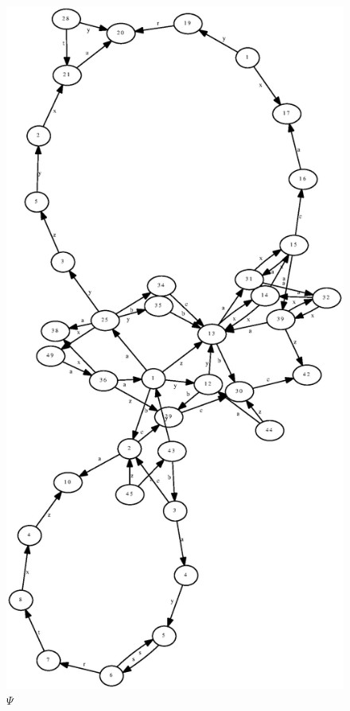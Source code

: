 \documentclass[a4paper,12pt]{article}
\numberwithin{equation}{section}
\numberwithin{figure}{section}
\begin{document}
\begin{figure}
\begin{center}
\includegraphics[scale=0.7,bb=0 0 820 720]{python/ex_K_reassembly.eps}
\caption{$\Psi$}
\label{fig:out}
\end{center}
\end{figure}
\end{document}

